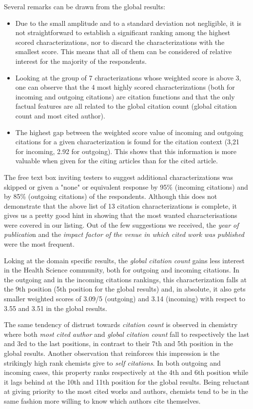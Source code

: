 \documentclass[runningheads,a4paper]{llncs}
\begin{document}
Several remarks can be drawn from the global results:
\begin{itemize}
\item Due to the small amplitude and to a standard deviation not negligible, it is not straightforward to establish a significant ranking among the highest scored characterizations, nor to discard the characterizations with the smallest score. This means that all of them can be considered of relative interest for the majority of the respondents.
\item Looking at the group of 7 chracterizations whose weighted score is above 3, one can observe that the 4 most highly scored characterizations (both for incoming and outgoing citations) are citation functions and that the only factual features are all related to the global citation count (global citation count and most cited author).
\item The highest gap between the weighted score value of incoming and outgoing citations for a given characterization is found for the citation context (3,21 for incoming, 2.92 for outgoing). This shows that this information is more valuable when given for the citing articles than for the cited article.
\end{itemize}

The free text box inviting testers to suggest additional characterizations was skipped or given a "none" or equivalent response by 95\% (incoming citations) and by 85\% (outgoing citations) of the respondents. Although this does not demonstrate that the above list of 13 citation characterizations is complete, it gives us a pretty good hint in showing that the most wanted characterisations were covered in our listing. Out of the few suggestions we received, the {\em year of publicatio}n and the {\em impact factor of the venue in which cited work was published} were the most frequent.

Loking at the domain specific results, the {\em global citation count }gains less interest in the Health Science community, both for outgoing and incoming citations. In the outgoing and in the incoming citations rankings, this characterization falls at the 9th position (5th position for the global results) and, in absolute, it also gets smaller weighted scores of 3.09/5 (outgoing) and 3.14 (incoming) with respect to 3.55 and 3.51 in the global results.

The same tendency of distrust towards {\em citation count }is observed in chemistry where both {\em most cited author }and {\em global citation count} fall to respectively the last and 3rd to the last positions, in contrast to their 7th and 5th position in the global results. Another observation that reinforces this impression is the strikingly high rank chemists give to {\em self citations}. In both outgoing and incoming cases, this property ranks respectively at the 4th and 6th position while it lags behind at the 10th and 11th position for the global results. Being reluctant at giving priority to the most cited works and authors, chemists tend to be in the same fashion more willing to know which authors cite themselves.
\end{document}
